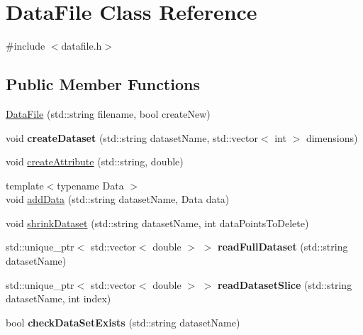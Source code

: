 \hypertarget{classDataFile}{}\section{Data\+File Class Reference}
\label{classDataFile}


{\ttfamily \#include $<$datafile.\+h$>$}

\subsection*{Public Member Functions}
\begin{DoxyCompactItemize}
\item 
\hyperlink{classDataFile_a506afaa3e498c06d841cfd2166724add}{Data\+File} (std\+::string filename, bool create\+New)
\item 
\mbox{\label{classDataFile_a85ee9b657be8e2e0bb69301352712c05}} 
void {\bfseries create\+Dataset} (std\+::string dataset\+Name, std\+::vector$<$ int $>$ dimensions)
\item 
void \hyperlink{classDataFile_a6da2338acc382d3538d53f5747e46b21}{create\+Attribute} (std\+::string, double)
\item 
{\footnotesize template$<$typename Data $>$ }\\void \hyperlink{classDataFile_a51739c09c99007a2cd3faa960efd45ed}{add\+Data} (std\+::string dataset\+Name, Data data)
\item 
void \hyperlink{classDataFile_add6a93dae24197b5dcd9e6824f77856c}{shrink\+Dataset} (std\+::string dataset\+Name, int data\+Points\+To\+Delete)
\item 
\mbox{\label{classDataFile_a07469209523bf5bb9b4997588f7fc822}} 
std\+::unique\+\_\+ptr$<$ std\+::vector$<$ double $>$ $>$ {\bfseries read\+Full\+Dataset} (std\+::string dataset\+Name)
\item 
\mbox{\label{classDataFile_a39c29339dc09376f18e5bdd3554f71ca}} 
std\+::unique\+\_\+ptr$<$ std\+::vector$<$ double $>$ $>$ {\bfseries read\+Dataset\+Slice} (std\+::string dataset\+Name, int index)
\item 
\mbox{\label{classDataFile_a775c1da3cdfc1cb6d986fe2e40c0a495}} 
bool {\bfseries check\+Data\+Set\+Exists} (std\+::string dataset\+Name)
\end{DoxyCompactItemize}
